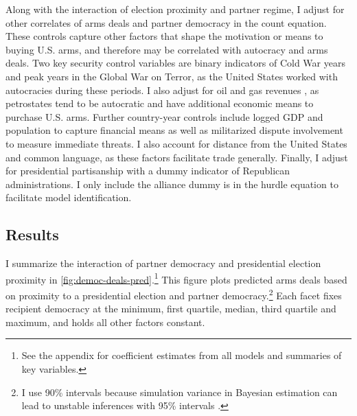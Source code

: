 \documentclass[12pt]{article}
\begin{document}
Along with the interaction of election proximity and partner regime, I adjust for other correlates of arms deals and partner democracy in the count equation. 
These controls capture other factors that shape the motivation or means to buying U.S. arms, and therefore may be correlated with autocracy and arms deals. 
Two key security control variables are binary indicators of Cold War years and peak years in the Global War on Terror, as the United States worked with autocracies during these periods. 
I also adjust for oil and gas revenues \citep{RossMahdavi2015}, as petrostates tend to be autocratic and have additional economic means to purchase U.S. arms.
Further country-year controls include logged GDP and population to capture financial means as well as militarized dispute involvement to measure immediate threats.
I also account for distance from the United States and common language, as these factors facilitate trade generally. 
Finally, I adjust for presidential partisanship with a dummy indicator of Republican administrations.  
I only include the alliance dummy is in the hurdle equation to facilitate model identification.


\subsection{Results}


I summarize the interaction of partner democracy and presidential election proximity in \autoref{fig:democ-deals-pred}.\footnote{See the appendix for coefficient estimates from all models and summaries of key variables.}
This figure plots predicted arms deals based on proximity to a presidential election and partner democracy.\footnote{I use 90\% intervals because simulation variance in Bayesian estimation can lead to unstable inferences with 95\% intervals \citep{McElreath2016}.}
Each facet fixes recipient democracy at the minimum, first quartile, median, third quartile and maximum, and holds all other factors constant.
\end{document}
